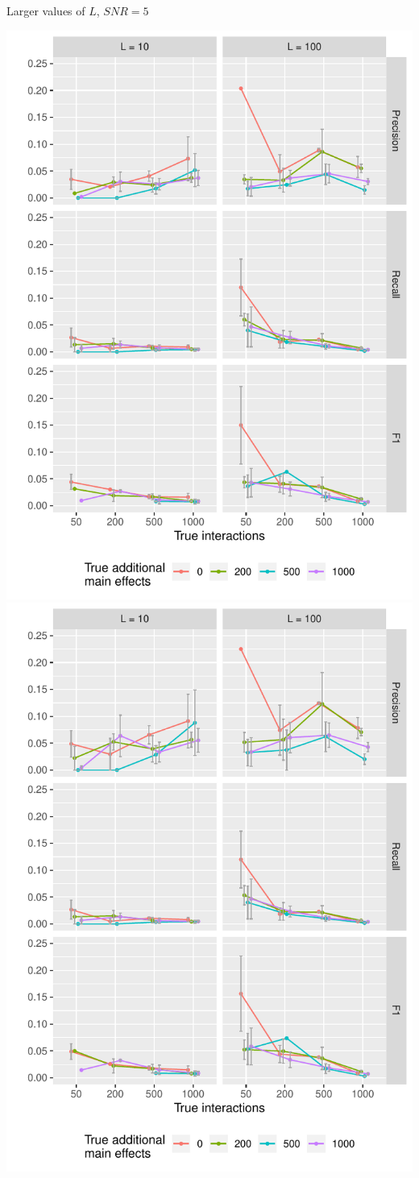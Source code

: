 \documentclass[8pt]{beamer}
\begin{document}
\begin{frame}{Larger values of $L$, $SNR = 5$}
\begin{center}
	\begin{minipage}{0.9\linewidth}
		\centering
		\includegraphics[width=0.5\linewidth]{"l_diff/l_diff_n10000_SNR5_tno"}%
		\includegraphics[width=0.5\linewidth]{"l_diff/l_diff_n10000_SNR5_tyes"}
	\end{minipage}
\end{center}

\end{frame}
\end{document}
